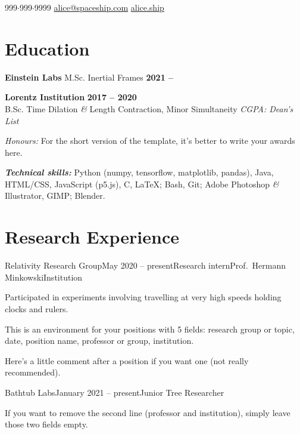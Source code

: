 \documentclass{resume}
\begin{document}
\begin{center}
    \contact
        {999$\cdot$999$\cdot$9999}
        {\href{mailto://alice@spaceship.com}{alice@spaceship.com}}
        {\href{https://alice.ship}{alice.ship}}
\end{center}

\section{Education} 
\begin{content}
    {\bf Einstein Labs} {M.Sc. Inertial Frames} \hfill {\bf 2021 --} 

    {\bf Lorentz Institution} \hfill {\bf 2017 -- 2020} \\ 
    {B.Sc. Time Dilation {\em\&} Length Contraction, Minor Simultaneity} \hfill 
    {\em CGPA:  \quad Dean's List}
    
    \vspace{-.25\baselineskip}
    
    {\em Honours:} For the short version of the template, it's better to write your awards here.
    
    {\bf \em Technical skills:} Python {\footnotesize (numpy, tensorflow, matplotlib, pandas)}, Java, HTML/CSS, JavaScript (p5.js), C, \LaTeX; Bash, Git; Adobe Photoshop {\em \&} Illustrator, GIMP; Blender.
\sectionlineskip
\end{content}

\section{Research Experience}
\begin{content}

    \begin{position}{Relativity Research Group}{May 2020 -- present}{Research intern}{Prof.~Hermann Minkowski}{Institution}
    \item Participated in experiments involving travelling at very high speeds holding clocks and rulers.
    \item This is an environment for your positions with 5 fields: research group or topic, date, position name, professor or group, institution. 
    \end{position}
    \vspace{-.5\baselineskip}
    Here's a little comment after a position if you want one (not really recommended).

    \begin{position}{Bathtub Labs}{January 2021 -- present}{Junior Tree Researcher}{}{}
    \item If you want to remove the second line (professor and institution), simply leave those two fields empty. 
    \end{position}

\sectionlineskip
\end{content}
\end{document}
